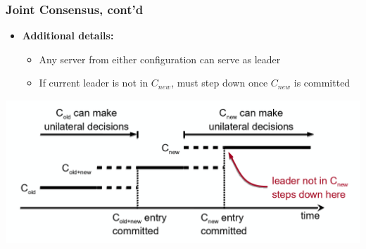 \begin{frame}
    \frametitle{Joint Consensus, cont'd}
    \begin{itemize}
        \item \textbf{Additional details:}
            \begin{itemize}
                \item Any server from either configuration can serve as leader
                \item If current leader is not in $C_{new}$, must step down once $C_{new}$ is committed
            \end{itemize}
    \end{itemize}
    \includegraphics[scale=0.3]{./figures/raft-joint-consensus2.png}
\end{frame}



